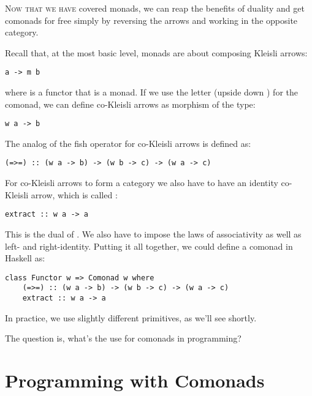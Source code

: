 \lettrine[lhang=0.17]{N}{ow that we have} covered monads, we can reap the benefits of duality and
get comonads for free simply by reversing the arrows and working in the
opposite category.

Recall that, at the most basic level, monads are about composing Kleisli
arrows:

\begin{Verbatim}[commandchars=\\\{\}]
a -> m b
\end{Verbatim}
where  is a functor that is a monad. If we use the letter
 (upside down ) for the comonad, we can define
co-Kleisli arrows as morphism of the type:

\begin{Verbatim}[commandchars=\\\{\}]
w a -> b
\end{Verbatim}
The analog of the fish operator for co-Kleisli arrows is defined as:

\begin{Verbatim}[commandchars=\\\{\}]
(=>=) :: (w a -> b) -> (w b -> c) -> (w a -> c)
\end{Verbatim}
For co-Kleisli arrows to form a category we also have to have an
identity co-Kleisli arrow, which is called :

\begin{Verbatim}[commandchars=\\\{\}]
extract :: w a -> a
\end{Verbatim}
This is the dual of . We also have to impose the laws of
associativity as well as left- and right-identity. Putting it all
together, we could define a comonad in Haskell as:

\begin{Verbatim}[commandchars=\\\{\}]
class Functor w => Comonad w where
    (=>=) :: (w a -> b) -> (w b -> c) -> (w a -> c)
    extract :: w a -> a
\end{Verbatim}
In practice, we use slightly different primitives, as we'll see shortly.

The question is, what's the use for comonads in programming?

\section{Programming with Comonads}\label{programming-with-comonads}

